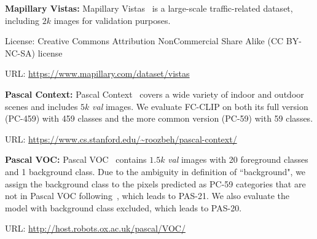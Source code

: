\documentclass{article}
\newcommand{\modelname}{FC-CLIP\xspace}
\begin{document}
\noindent\textbf{Mapillary Vistas:}\quad
Mapillary Vistas~\cite{neuhold2017mapillary} is a large-scale traffic-related dataset, including $2k$ images for validation purposes.

License: Creative Commons Attribution NonCommercial Share Alike (CC BY-NC-SA) license

URL: \url{https://www.mapillary.com/dataset/vistas}

\noindent\textbf{Pascal Context:} \quad
Pascal Context~\cite{mottaghi2014role} covers a wide variety of indoor and outdoor scenes and includes $5k$ \textit{val} images. We evaluate \modelname on both its full version (PC-459) with 459 classes and the more common version (PC-59) with 59 classes.

URL: \url{https://www.cs.stanford.edu/~roozbeh/pascal-context/}

\noindent\textbf{Pascal VOC:} \quad
Pascal VOC~\cite{everingham2010pascal} contains $1.5k$ \textit{val} images with 20 foreground classes and 1 background class. Due to the ambiguity in definition of ``background", we assign the background class to the pixels predicted as PC-59 categories that are not in Pascal VOC following~\cite{ghiasi2022scaling}, which leads to PAS-21. We also evaluate the model with background class excluded, which leads to PAS-20.

URL: \url{http://host.robots.ox.ac.uk/pascal/VOC/} 
\end{document}
